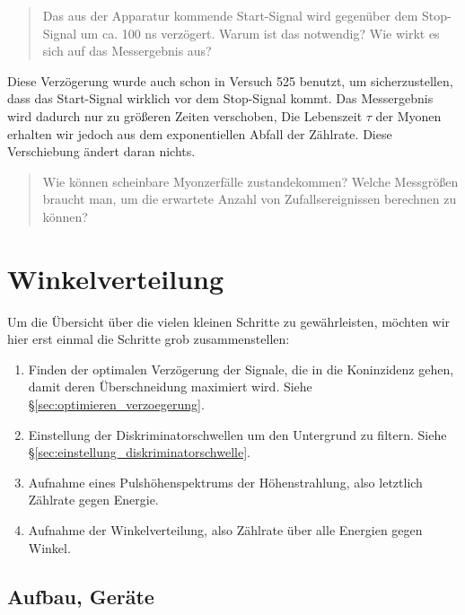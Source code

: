 \documentclass[11pt, ngerman, fleqn, DIV=15, headinclude, BCOR=2cm]{scrreprt}
\begin{document}
\begin{quote}
    Das aus der Apparatur kommende Start-Signal wird gegenüber dem Stop-Signal
    um ca. 100 ns verzögert. Warum ist das notwendig? Wie wirkt es sich auf das
    Messergebnis aus?
\end{quote}

Diese Verzögerung wurde auch schon in Versuch 525 benutzt, um sicherzustellen,
dass das Start-Signal wirklich vor dem Stop-Signal kommt. Das Messergebnis wird
dadurch nur zu größeren Zeiten verschoben, Die Lebenszeit $\tau$ der Myonen
erhalten wir jedoch aus dem exponentiellen Abfall der Zählrate. Diese
Verschiebung ändert daran nichts.

\begin{quote}
    Wie können scheinbare Myonzerfälle zustandekommen? Welche Messgrößen
    braucht man, um die erwartete Anzahl von Zufallsereignissen berechnen zu
    können?
\end{quote}


\chapter{Winkelverteilung}

Um die Übersicht über die vielen kleinen Schritte zu gewährleisten, möchten wir
hier erst einmal die Schritte grob zusammenstellen:

\begin{enumerate}
    \item
        Finden der optimalen Verzögerung der Signale, die in die Koninzidenz
        gehen, damit deren Überschneidung maximiert wird. Siehe
        §\ref{sec:optimieren_verzoegerung}.

    \item
        Einstellung der Diskriminatorschwellen um den Untergrund zu
        filtern. Siehe §\ref{sec:einstellung_diskriminatorschwelle}.
        
    \item
        Aufnahme eines Pulshöhenspektrums der Höhenstrahlung, also letztlich
        Zählrate gegen Energie.

    \item
        Aufnahme der Winkelverteilung, also Zählrate über alle Energien gegen
        Winkel.
\end{enumerate}

\section{Aufbau, Geräte}
\end{document}
